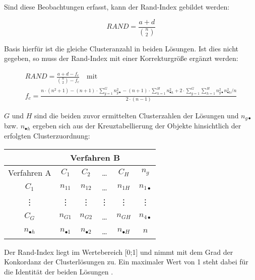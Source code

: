Sind diese Beobachtungen erfasst, kann der Rand-Index gebildet werden:

\begin{equation}
RAND = \frac{a+d}{\binom{n}{2}}
\end{equation}

Basis hierfür ist die gleiche Clusteranzahl in beiden Lösungen. Ist dies nicht gegeben, so muss der Rand-Index mit einer Korrekturgröße ergänzt werden:

 \begin{gather}
 RAND = \frac{a+d-f_c}{\binom{n}{2}-f_c} \quad \text{mit} \\
 f_c = \frac{n\cdot(n^2+1)-(n+1)\cdot\sum_{g=1}^{G}n_{g \bullet}^2-(n+1)\cdot\sum_{h=1}^{H}n_{\bullet h}^2+2\cdot\sum_{g=1}^{G}\sum_{h=1}^{H}n_{g \bullet}^2n_{ \bullet h}^2/n}{2\cdot(n-1)}
 \end{gather}
 
 $G$ und $H$ sind die beiden zuvor ermittelten Clusterzahlen der Lösungen und $n_{g \bullet}$ bzw. $n_{ \bullet h}$ ergeben sich aus der Kreuztabellierung der Objekte hinsichtlich der erfolgten Clusterzuordnung: \\
 
\begin{center}
\begin{tabular}{|c|c|c|c|c|c|} 
	\hline
	& \multicolumn{4}{c|}{Verfahren B} & \\ \hline
	Verfahren A & $C_1$ & $C_2$ & \dots & $C_H$ & $n_g$ \\ \hline
	$C_1$ & $n_{11}$ & $n_{12}$ & \dots & $n_{1H}$ & $n_{1 \bullet}$ \\
	\vdots & \vdots & \vdots & \vdots & \vdots & \vdots \\
	$C_G$ & $n_{G1}$ & $n_{G2}$ & \dots & $n_{GH}$ & $n_{4 \bullet}$ \\ \hline
	$n_{\bullet h}$ & $n_{\bullet 1}$ & $n_{\bullet 2}$ & \dots & $n_{\bullet H}$ & $n$ \\ \hline
\end{tabular}
\end{center}
\bigskip

Der Rand-Index liegt im Wertebereich [0;1] und nimmt mit dem Grad der Konkordanz der Clusterlösungen zu. Ein maximaler Wert von 1 steht dabei für die Identität der beiden Lösungen \citep[Vgl.][S. 270-272]{Everitt.2011}. 